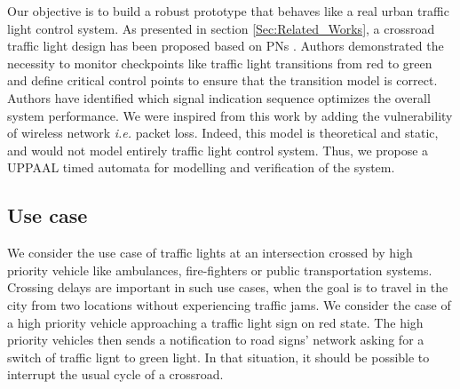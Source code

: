 \documentclass[conference]{../../setup/IEEEtran}
\begin{document}
Our objective is to build a robust prototype that behaves like a real urban traffic light control system.
As presented in section \ref{Sec:Related_Works}, a crossroad traffic light design has been proposed based on PNs \cite{huang_modular_2014}. Authors demonstrated the necessity to monitor checkpoints like traffic light transitions from red to green and define critical control points to ensure that the transition model is correct. Authors have identified which signal indication sequence optimizes the overall system performance. We were inspired from this work by adding the vulnerability of wireless network \emph{i.e.} packet loss. Indeed, this model is theoretical and static, and would not model entirely traffic light control system. Thus, we propose a UPPAAL timed automata for modelling and verification of the system.



%


\subsection{Use case}

We consider the use case of traffic lights at an intersection crossed by high priority vehicle like ambulances, fire-fighters or public transportation systems. Crossing delays are important in such use cases, when the goal is to travel in the city from two locations without experiencing traffic jams. We consider the case of a high priority vehicle approaching a traffic light sign on red state. The high priority vehicles then sends a notification to road signs' network asking for a switch of traffic lignt to green light. In that situation, it should be possible to interrupt the usual cycle of a crossroad. 
\end{document}
